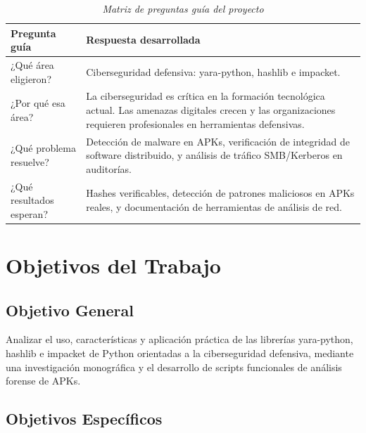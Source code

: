 \documentclass[12pt,a4paper]{article}
\begin{document}
\begin{table}[H]
\centering
\begin{threeparttable}
\caption{\textit{Matriz de preguntas guía del proyecto}}
\begin{tabular}{p{4.5cm}p{8cm}}
\toprule
\textbf{Pregunta guía} & \textbf{Respuesta desarrollada} \\
\midrule
¿Qué área eligieron? & Ciberseguridad defensiva: yara-python, hashlib e impacket. \\
¿Por qué esa área? & La ciberseguridad es crítica en la formación tecnológica actual. Las amenazas digitales crecen y las organizaciones requieren profesionales en herramientas defensivas. \\
¿Qué problema resuelve? & Detección de malware en APKs, verificación de integridad de software distribuido, y análisis de tráfico SMB/Kerberos en auditorías. \\
¿Qué resultados esperan? & Hashes verificables, detección de patrones maliciosos en APKs reales, y documentación de herramientas de análisis de red. \\
\bottomrule
\end{tabular}
\end{threeparttable}
\end{table}

\section{Objetivos del Trabajo}

\subsection{Objetivo General}

Analizar el uso, características y aplicación práctica de las librerías
yara-python, hashlib e impacket de Python orientadas a la ciberseguridad
defensiva, mediante una investigación monográfica y el desarrollo de
scripts funcionales de análisis forense de APKs.

\subsection{Objetivos Específicos}
\end{document}
